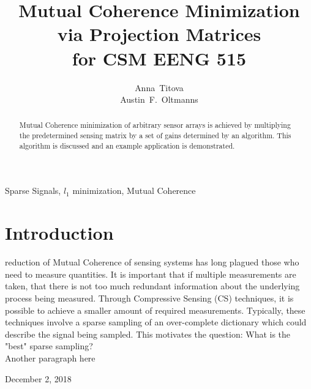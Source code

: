 \documentclass[journal]{IEEEtran}
\begin{document}
\title{Mutual Coherence Minimization \\via Projection Matrices\\ for CSM EENG 515}


\author{ 
Anna~Titova \\
Austin~F.~Oltmanns%
}

\maketitle


\begin{abstract}
Mutual Coherence minimization of arbitrary sensor arrays is achieved 
by multiplying the predetermined sensing matrix by a set of gains
determined by an algorithm. This algorithm is discussed and an example
application is demonstrated.
\end{abstract}
\begin{IEEEkeywords}
Sparse Signals, $l_1$ minimization, Mutual Coherence
\end{IEEEkeywords}

\section{Introduction}
 reduction of Mutual Coherence of sensing systems has long plagued
those who need to measure quantities. It is important that if multiple measurements
are taken, that there is not too much redundant information about the underlying 
process being measured. Through Compressive Sensing (CS) techniques, it is possible to achieve
a smaller amount of required measurements. Typically, these techniques involve a sparse
sampling of an over-complete dictionary which could describe the signal being sampled. This 
motivates the question: What is the "best" sparse sampling? \\
Another paragraph here

\hfill December 2, 2018
\end{document}
